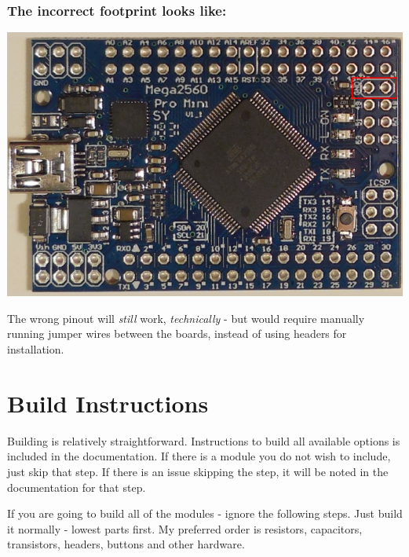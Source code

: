 \documentclass[11pt]{article}
\begin{document}
\subsubsection{The \textbf{incorrect} footprint looks like:}
\label{sec:org255cc41}
\begin{center}
\includegraphics[width=.9\linewidth]{../png/2.1/Wrong2560.png}
\end{center}

The wrong pinout will \emph{still} work, \emph{technically} - but would require manually running jumper wires between the boards, instead of using headers for installation.

\newpage
\section{Build Instructions}
\label{sec:orgcd3bf7e}
Building is relatively straightforward.  Instructions to build all available options is included in the documentation.  If there is a module you do not wish to include, just skip that step.  If there is an issue skipping the step, it will be noted in the documentation for that step.

If you are going to build all of the modules - ignore the following steps.  Just build it normally - lowest parts first.  My preferred order is resistors, capacitors, transistors, headers, buttons and other hardware.
\end{document}
